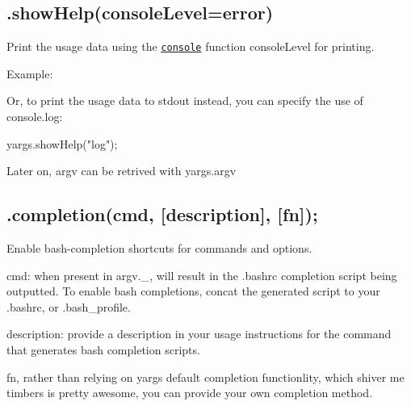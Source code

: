 

\subsection*{.show\+Help(console\+Level=\textquotesingle{}error\textquotesingle{}) }

Print the usage data using the \href{https://nodejs.org/api/console.html}{\tt {\ttfamily console}} function {\ttfamily console\+Level} for printing.

Example\+:




Or, to print the usage data to {\ttfamily stdout} instead, you can specify the use of {\ttfamily console.\+log}\+:


\begin{DoxyCode}
yargs.showHelp("log");
\end{DoxyCode}


Later on, {\ttfamily argv} can be retrived with {\ttfamily yargs.\+argv}

\subsection*{.completion(cmd, \mbox{[}description\mbox{]}, \mbox{[}fn\mbox{]}); }

Enable bash-\/completion shortcuts for commands and options.

{\ttfamily cmd}\+: when present in {\ttfamily argv.\+\_\+}, will result in the {\ttfamily .bashrc} completion script being outputted. To enable bash completions, concat the generated script to your {\ttfamily .bashrc}, or {\ttfamily .bash\+\_\+profile}.

{\ttfamily description}\+: provide a description in your usage instructions for the command that generates bash completion scripts.

{\ttfamily fn}, rather than relying on yargs\textquotesingle{} default completion functionlity, which shiver me timbers is pretty awesome, you can provide your own completion method.


